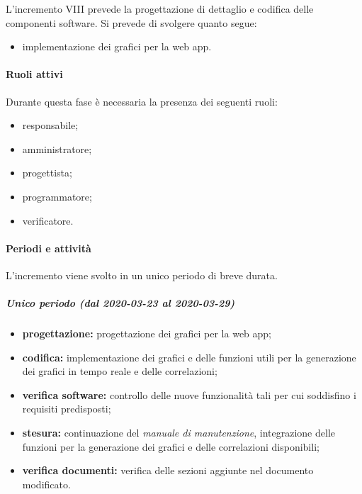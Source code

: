 			L'incremento VIII prevede la progettazione di dettaglio e codifica delle componenti software. Si prevede di svolgere quanto segue:
			\begin{itemize}
				\item implementazione dei grafici per la web app.
			\end{itemize}
			
			\paragraph{Ruoli attivi}
			
				Durante questa fase è necessaria la presenza dei seguenti ruoli:
				\begin{itemize}
					\item responsabile;
					\item amministratore;
					\item progettista;
					\item programmatore;
					\item verificatore.
				\end{itemize}
			
			\paragraph{Periodi e attività}
			
				L'incremento viene svolto in un unico periodo di breve durata.
				
				\subparagraph{Unico periodo (dal 2020-03-23 al 2020-03-29)}
				
					\begin{itemize}
						\item \textbf{progettazione:} progettazione dei grafici per la web app;
						\item \textbf{codifica:} implementazione dei grafici e delle funzioni utili per la generazione dei grafici in tempo reale e delle correlazioni;
						\item \textbf{verifica software:} controllo delle nuove funzionalità tali per cui soddisfino i requisiti predisposti;
						\item \textbf{stesura:} continuazione del \textit{manuale di manutenzione}, integrazione delle funzioni per la generazione dei grafici e delle correlazioni disponibili;
						\item \textbf{verifica documenti:} verifica delle sezioni aggiunte nel documento modificato.
					\end{itemize} 			

